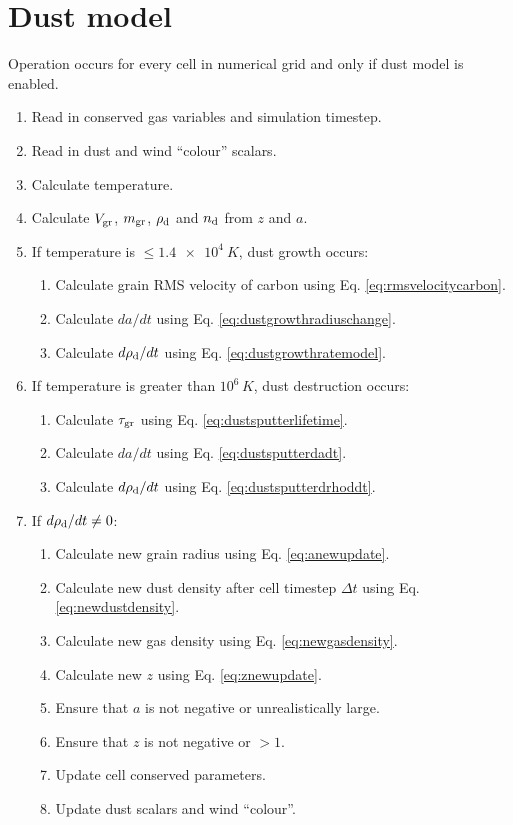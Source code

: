 \section{Dust model}

Operation occurs for every cell in numerical grid and only if dust model is enabled.

\begin{enumerate}
  \item Read in conserved gas variables and simulation timestep.
  \item Read in dust and wind ``colour'' scalars.
  \item Calculate temperature.
  \item Calculate $V_\text{gr}$, $m_\text{gr}$, $\rho_\text{d}$ and $n_\text{d}$ from $z$ and $a$.
  \item If temperature is $\leq \SI{1.4e4}{K}$, dust growth occurs:
  \begin{enumerate}
    \item Calculate grain RMS velocity of carbon using Eq. \ref{eq:rmsvelocitycarbon}.
    \item Calculate $da/dt$ using Eq. \ref{eq:dustgrowthradiuschange}.
    \item Calculate $d\rho_\text{d}/dt$ using Eq. \ref{eq:dustgrowthratemodel}.
  \end{enumerate}
  \item If temperature is greater than $10^6\,\si{K}$, dust destruction occurs:
  \begin{enumerate}
    \item Calculate $\tau_\text{gr}$ using Eq. \ref{eq:dustsputterlifetime}.
    \item Calculate $da/dt$ using Eq. \ref{eq:dustsputterdadt}.
    \item Calculate $d\rho_\text{d}/dt$ using Eq. \ref{eq:dustsputterdrhoddt}.
  \end{enumerate}
  \item If $d\rho_\text{d}/dt \neq 0$:
  \begin{enumerate}
    \item Calculate new grain radius using Eq. \ref{eq:anewupdate}.
    \item Calculate new dust density after cell timestep $\Delta t$ using Eq. \ref{eq:newdustdensity}.
    \item Calculate new gas density using Eq. \ref{eq:newgasdensity}.
    \item Calculate new $z$ using Eq. \ref{eq:znewupdate}.
    \item Ensure that $a$ is not negative or unrealistically large.
    \item Ensure that $z$ is not negative or $>1$.
    \item Update cell conserved parameters.
    \item Update dust scalars and wind ``colour''.
  \end{enumerate}
\end{enumerate}

